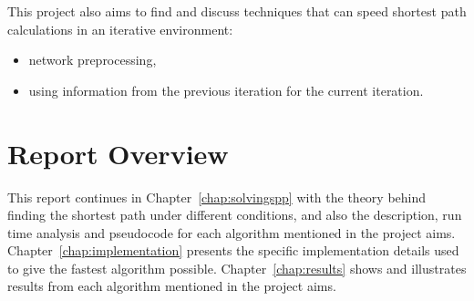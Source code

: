 This project also aims to find and discuss techniques that can speed shortest path calculations in an iterative environment:
\begin{itemize}
    \item network preprocessing,
    \item using information from the previous iteration for the current iteration.
\end{itemize}

\section{Report Overview}
This report continues in Chapter~\ref{chap:solvingspp} with the theory behind finding the shortest path under different conditions,
and also the description, run time analysis and pseudocode for each algorithm mentioned in the project aims.
Chapter~\ref{chap:implementation} presents the specific implementation details used to give the fastest algorithm possible.
Chapter~\ref{chap:results} shows and illustrates results from each algorithm mentioned in the project aims.


